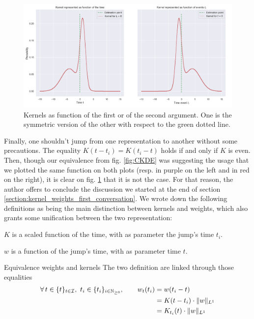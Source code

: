 \begin{figure}
\centering
\includegraphics[width = 1.00 \textwidth]{../imag/chap3/CKDE2.png}
\caption{Kernels as function of the first or of the second argument. One is the symmetric version of the other with respect to the green dotted line.}
\label{fig:CKDE2}
\end{figure}


\newpage 
Finally, one shouldn't jump from one representation to another without some precautions. The equality $K(t - t_i) = K(t_i - t)$ holds if and only if $K$ is even. Then, though our equivalence from fig. \ref{fig:CKDE} was suggesting the usage that we plotted the same function on both plots (resp. in purple on the left and in red on the right), it is clear on fig. \ref{fig:CKDE2} that it is not the case. For that reason, the author offers to conclude the discussion we started at the end of section \ref{section:kernel_weights_first_conversation}. We wrote down the following definitions as being the main distinction between kernels and weights, which also grants some unification between the two representation:
\begin{definition}[Kernel]
$K$ is a scaled function of the time, with as parameter the jump's time $t_i$.
\end{definition}

\begin{definition}
$w$ is a function of the jump's time, with as parameter time $t$.
\end{definition}

\begin{theoreme}[label = thrm:equiv_w_k]{Equivalence weights and kernels}
The two definition are linked through those equalities
\begin{align*}
\forall t \in \sequencetime, \ t_i \in \sequence{t_i }, \qquad w_t(t_i) 
&= w(t_i - t) \\
&=  K(t - t_i) \cdot \norm{w}_{L^1} \\
&= K_{t_i}(t) \cdot \norm{w}_{L^1}
\end{align*}
\end{theoreme}





